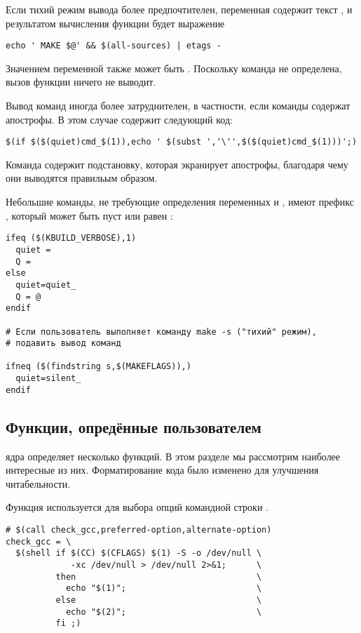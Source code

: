 Если тихий режим вывода более предпочтителен, переменная
 содержит текст , и результатом
вычисления функции будет выражение

\begin{verbatim}
echo ' MAKE $@' && $(all-sources) | etags -
\end{verbatim}

Значением переменной также может быть . Поскольку команда
 не определена, вызов функции  ничего
не выводит.

Вывод команд иногда более затруднителен, в частности, если команды содержат
апострофы. В этом случае \Makefile{} содержит следующий код:

\begin{verbatim}
$(if $($(quiet)cmd_$(1)),echo ' $(subst ','\'',$($(quiet)cmd_$(1)))';)
\end{verbatim}

Команда  содержит подстановку, которая экранирует апострофы,
благодаря чему они выводятся правильым образом.

Небольшие команды, не требующие определения переменных 
и , имеют префикс , который может
быть пуст или равен :

\begin{verbatim}
ifeq ($(KBUILD_VERBOSE),1)
  quiet =
  Q =
else
  quiet=quiet_
  Q = @
endif

# Если пользователь выполняет команду make -s ("тихий" режим),
# подавить вывод команд

ifneq ($(findstring s,$(MAKEFLAGS)),)
  quiet=silent_
endif
\end{verbatim}

\subsection{Функции, опредённые пользователем}

\Makefile{} ядра определяет несколько функций. В этом разделе мы
рассмотрим наиболее интересные из них. Форматирование кода было
изменено для улучшения читабельности.

Функция  используется для выбора опций
командной строки .

\begin{verbatim}
# $(call check_gcc,preferred-option,alternate-option)
check_gcc = \
  $(shell if $(CC) $(CFLAGS) $(1) -S -o /dev/null \
             -xc /dev/null > /dev/null 2>&1;      \
          then                                    \
            echo "$(1)";                          \
          else                                    \
            echo "$(2)";                          \
          fi ;)
\end{verbatim}

